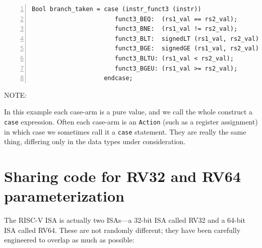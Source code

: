 {\footnotesize
\begin{Verbatim}[frame=single, numbers=left, label=from src\_Common/Fn\_EX\_Control.bsv]
Bool branch_taken = case (instr_funct3 (instr))
                       funct3_BEQ:  (rs1_val == rs2_val);
                       funct3_BNE:  (rs1_val != rs2_val);
                       funct3_BLT:  signedLT (rs1_val, rs2_val);
                       funct3_BGE:  signedGE (rs1_val, rs2_val);
                       funct3_BLTU: (rs1_val < rs2_val);
                       funct3_BGEU: (rs1_val >= rs2_val);
                    endcase;
\end{Verbatim}
}


\vspace{1ex}

NOTE: 

\vspace{1ex}


In this example each case-arm is a pure value, and we call the whole
construct a \verb|case| expression.  Often each case-arm is an
\verb|Action| (such as a register assignment) in which case we
sometimes call it a \verb|case| statement.  They are really the same
thing, differing only in the data types under consideration.




\section{Sharing code for RV32 and RV64 {\via} parameterization}

\label{BSV_Paramterizing_XLEN}


The RISC-V ISA is actually two ISAs---a 32-bit ISA called RV32 and a
64-bit ISA called RV64.  These are not randomly different; they have
been carefully engineered to overlap as much as possible:


